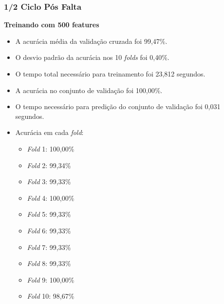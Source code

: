 \subsubsection{1/2 Ciclo Pós Falta}
\textbf{Treinando com 500 features}
\begin{itemize}
    \item A acurácia média da validação cruzada foi 99,47\%.
    \item O desvio padrão da acurácia nos 10 \textit{folds} foi 0,40\%.
    \item O tempo total necessário para treinamento foi 23,812 segundos.
    \item A acurácia no conjunto de validação foi 100,00\%.
    \item O tempo necessário para predição do conjunto de validação foi 0,031 segundos.
    \item Acurácia em cada \textit{fold}:
    \begin{itemize}
        \item \textit{Fold} 1: 100,00\%
        \item \textit{Fold} 2: 99,34\%
        \item \textit{Fold} 3: 99,33\%
        \item \textit{Fold} 4: 100,00\%
        \item \textit{Fold} 5: 99,33\%
        \item \textit{Fold} 6: 99,33\%
        \item \textit{Fold} 7: 99,33\%
        \item \textit{Fold} 8: 99,33\%
        \item \textit{Fold} 9: 100,00\%
        \item \textit{Fold} 10: 98,67\%
    \end{itemize}
\end{itemize}


